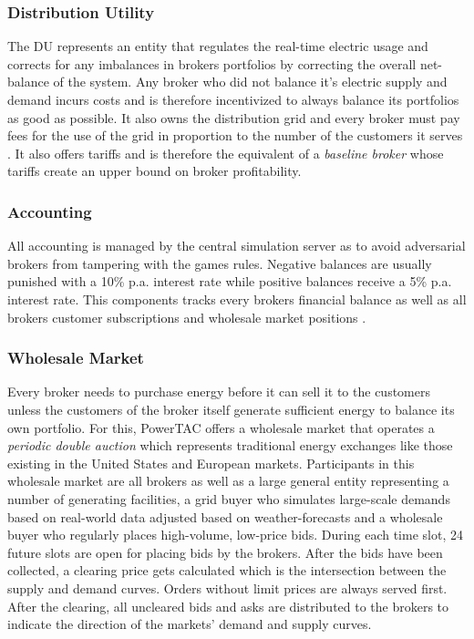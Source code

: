 \subsubsection{Distribution Utility} The \ac{DU} represents an entity that regulates the real-time electric usage and
corrects for any imbalances in brokers portfolios by correcting the overall net-balance of the system. Any broker who
did not balance it's electric supply and demand incurs costs and is therefore incentivized to always balance its
portfolios as good as possible. It also owns the distribution grid and every broker must pay fees for the use of the
grid in proportion to the number of the customers it serves \citep[p.10]{ketter2018powertac}. It also offers tariffs and
is therefore the equivalent of a \emph{baseline broker} whose tariffs create an upper bound on broker profitability.

\subsubsection{Accounting} All accounting is managed by the central simulation server as to avoid adversarial brokers
from tampering with the games rules. Negative balances are usually punished with a 10\% p.a. interest rate while
positive balances receive a 5\% p.a. interest rate. This components tracks every brokers financial balance as well as
all brokers customer subscriptions and wholesale market positions \citep[p.11]{ketter2018powertac}.

\subsubsection{Wholesale Market}
Every broker needs to purchase energy before it can sell it to the customers unless the customers of the broker itself
generate sufficient energy to balance its own portfolio. For this, \ac{PowerTAC} offers a wholesale market that operates
a \emph{periodic double auction} which represents traditional energy exchanges like those existing in the United States
and European markets. Participants in this wholesale market are all brokers as well as a large general entity
representing a number of generating facilities, a grid buyer who simulates large-scale demands based on real-world data
adjusted based on weather-forecasts and a wholesale buyer who regularly places high-volume, low-price bids. During each
time slot, 24 future slots are open for placing bids by the brokers. After the bids have been collected, a clearing
price gets calculated which is the intersection between the supply and demand curves. Orders without limit prices are
always served first. After the clearing, all uncleared bids and asks are distributed to the brokers to indicate the
direction of the markets' demand and supply curves.

